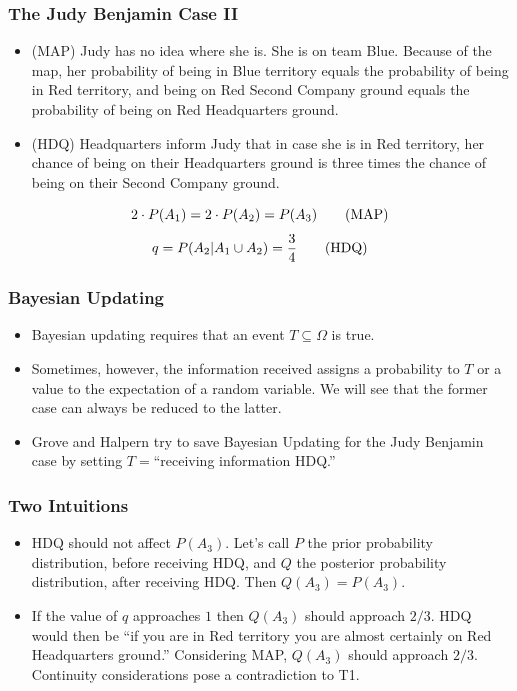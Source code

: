 \documentclass[xcolor=dvipsnames]{beamer}
\begin{document}
\begin{frame}
  \frametitle{The Judy Benjamin Case II}
\begin{itemize}
\item (MAP) Judy has no idea where she is. She is on team Blue.
  Because of the map, her probability of being in Blue territory
  equals the probability of being in Red territory, and being on Red
  Second Company ground equals the probability of being on Red
  Headquarters ground.
\item (HDQ) Headquarters inform Judy that in case she is in Red
  territory, her chance of being on their Headquarters ground is three
  times the chance of being on their Second Company ground.
\end{itemize}
\begin{equation}
  \label{eq:map}
  2\cdot{}P(A_{1})=2\cdot{}P(A_{2})=P(A_{3})\tag{\mbox{MAP}}
\end{equation}
\begin{equation}
  \label{eq:hdq}
  q=P(A_{2}|A_{1}\cup{}A_{2})=\frac{3}{4}\tag{\mbox{HDQ}}
\end{equation}
\end{frame}

\begin{frame}
  \frametitle{Bayesian Updating}
  \color{blue}{Why Bayesian Updating might not work:}
\begin{itemize}
  \item Bayesian updating requires that an event
    $T\subseteq{}\Omega$ is true.
  \item Sometimes, however, the information received assigns a
    probability to $T$ or a value to the expectation of a random
    variable. We will see that the former case can always be reduced
    to the latter.
  \item Grove and Halpern try to save Bayesian Updating for the
    Judy Benjamin case by setting $T=$``receiving information HDQ.''
  \end{itemize}
\end{frame}

\begin{frame}
  \frametitle{Two Intuitions}
  \begin{itemize}
  \item<1->[\color{blue}{(T1)}] HDQ should not affect $P(A_{3})$. Let's
    call $P$ the prior probability distribution, before receiving HDQ,
    and $Q$ the posterior probability distribution, after receiving
    HDQ. Then $Q(A_{3})=P(A_{3})$.
  \item<2->[\color{blue}{(T2)}] If the value of $q$ approaches $1$
  then $Q(A_{3})$ should approach $2/3$. HDQ would then be ``if you
  are in Red territory you are almost certainly on Red Headquarters
  ground.'' Considering MAP, $Q(A_{3})$ should approach $2/3$.
  Continuity considerations pose a contradiction to T1.
  \end{itemize}
\end{frame}
\end{document}
